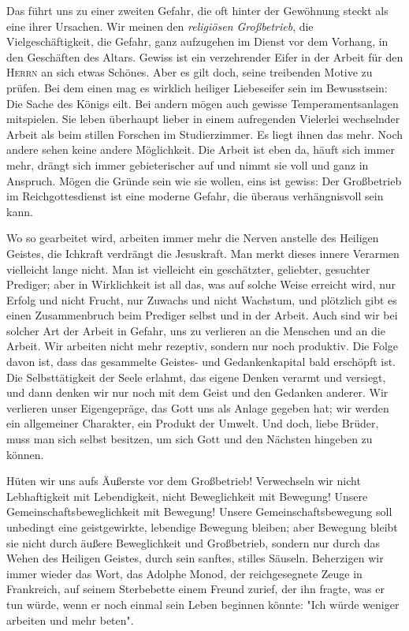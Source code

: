 \documentclass[a5paper,openany]{book}
\begin{document}
\par
Das führt uns zu einer zweiten Gefahr, die oft hinter der Gewöhnung steckt als eine ihrer Ursachen. Wir meinen den \emph{religiösen Großbetrieb}, die Vielgeschäftigkeit, die Gefahr, ganz aufzugehen im Dienst vor dem Vorhang, in den Geschäften des Altars. Gewiss ist ein verzehrender Eifer in der Arbeit für den \textsc{Herrn} an sich etwas Schönes. Aber es gilt doch, seine treibenden Motive zu prüfen. Bei dem einen mag es wirklich heiliger Liebeseifer sein im Bewusstsein: Die Sache des Königs eilt. Bei andern mögen auch gewisse Temperamentsanlagen mitspielen. Sie leben überhaupt lieber in einem aufregenden Vielerlei wechselnder Arbeit als beim stillen Forschen im Studierzimmer. Es liegt ihnen das mehr. Noch andere sehen keine andere Möglichkeit. Die Arbeit ist eben da, häuft sich immer mehr, drängt sich immer gebieterischer auf und nimmt sie voll und ganz in Anspruch. Mögen die Gründe sein wie sie wollen, eins ist gewiss: Der Großbetrieb im Reichgottesdienst ist eine moderne Gefahr, die überaus verhängnisvoll sein kann.
\par
Wo so gearbeitet wird, arbeiten immer mehr die Nerven anstelle des Heiligen Geistes, die Ichkraft verdrängt die Jesuskraft. Man merkt dieses innere Verarmen vielleicht lange nicht. Man ist vielleicht ein geschätzter, geliebter, gesuchter Prediger; aber in Wirklichkeit ist all das, was auf solche Weise erreicht wird, nur Erfolg und nicht Frucht, nur Zuwachs und nicht Wachstum, und plötzlich gibt es einen Zusammenbruch beim Prediger selbst und in der Arbeit. Auch sind wir bei solcher Art der Arbeit in Gefahr, uns zu verlieren an die Menschen und an die Arbeit. Wir arbeiten nicht mehr rezeptiv, sondern nur noch produktiv. Die Folge davon ist, dass das gesammelte Geistes- und Gedankenkapital bald erschöpft ist. Die Selbsttätigkeit der Seele erlahmt, das eigene Denken verarmt und versiegt, und dann denken wir nur noch mit dem Geist und den Gedanken anderer. Wir verlieren unser Eigengepräge, das Gott uns als Anlage gegeben hat; wir werden ein allgemeiner Charakter, ein Produkt der Umwelt. Und doch, liebe Brüder, muss man sich selbst besitzen, um sich Gott und den Nächsten hingeben zu können.
\par
Hüten wir uns aufs Äußerste vor dem Großbetrieb! Verwechseln wir nicht Lebhaftigkeit mit Lebendigkeit, nicht Beweglichkeit mit Bewegung! Unsere Gemeinschaftsbeweglichkeit mit Bewegung! Unsere Gemeinschaftsbewegung soll unbedingt eine geistgewirkte, lebendige Bewegung bleiben; aber Bewegung bleibt sie nicht durch äußere Beweglichkeit und Großbetrieb, sondern nur durch das Wehen des Heiligen Geistes, durch sein sanftes, stilles Säuseln. Beherzigen wir immer wieder das Wort, das Adolphe Monod, der reichgesegnete Zeuge in Frankreich, auf seinem Sterbebette einem Freund zurief, der ihn fragte, was er tun würde, wenn er noch einmal sein Leben beginnen könnte: "Ich würde weniger arbeiten und mehr beten".
\end{document}
